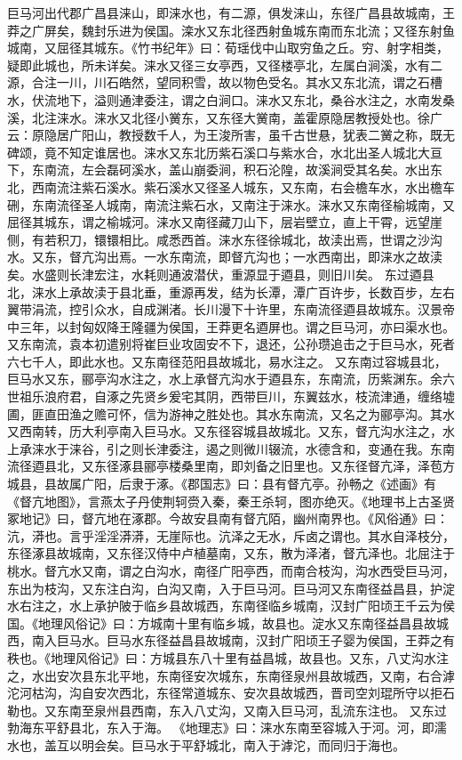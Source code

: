 \documentclass[12pt,UTF8]{ctexbook}
\begin{document}
巨马河出代郡广昌县涞山，即涞水也，有二源，俱发涞山，东径广昌县故城南，王莽之广屏矣，魏封乐进为侯国。滦水又东北径西射鱼城东南而东北流；又径东射鱼城南，又屈径其城东。《竹书纪年》曰：荀瑶伐中山取穷鱼之丘。穷、射字相类，疑即此城也，所未详矣。涞水又径三女亭西，又径楼亭北，左属白涧溪，水有二源，合注一川，川石皓然，望同积雪，故以物色受名。其水又东北流，谓之石槽水，伏流地下，溢则通津委注，谓之白涧口。涞水又东北，桑谷水注之，水南发桑溪，北注涞水。涞水又北径小黉东，又东径大黉南，盖霍原隐居教授处也。徐广云：原隐居广阳山，教授数千人，为王浚所害，虽千古世悬，犹表二黉之称，既无碑颂，竟不知定谁居也。涞水又东北历紫石溪口与紫水合，水北出圣人城北大亘下，东南流，左会磊砢溪水，盖山崩委涧，积石沦隍，故溪涧受其名矣。水出东北，西南流注紫石溪水。紫石溪水又径圣人城东，又东南，右会檐车水，水出檐车硎，东南流径圣人城南，南流注紫石水，又南注于涞水。涞水又东南径榆城南，又屈径其城东，谓之榆城河。涞水又南径藏刀山下，层岩壁立，直上干霄，远望崖侧，有若积刀，镮镮相比。咸悉西首。涞水东径徐城北，故渎出焉，世谓之沙沟水。又东，督亢沟出焉。一水东南流，即督亢沟也；一水西南出，即涞水之故渎矣。水盛则长津宏注，水耗则通波潜伏，重源显于逎县，则旧川矣。
东过逎县北，涞水上承故渎于县北垂，重源再发，结为长潭，潭广百许步，长数百步，左右翼带涓流，控引众水，自成渊渚。长川漫下十许里，东南流径逎县故城东。汉景帝中三年，以封匈奴降王隆疆为侯国，王莽更名逎屏也。谓之巨马河，亦曰渠水也。又东南流，袁本初遣别将崔巨业攻固安不下，退还，公孙瓒追击之于巨马水，死者六七千人，即此水也。又东南径范阳县故城北，易水注之。
又东南过容城县北，巨马水又东，郦亭沟水注之，水上承督亢沟水于逎县东，东南流，历紫渊东。余六世祖乐浪府君，自涿之先贤乡爰宅其阴，西带巨川，东翼兹水，枝流津通，缠络墟圃，匪直田渔之赡可怀，信为游神之胜处也。其水东南流，又名之为郦亭沟。其水又西南转，历大利亭南入巨马水。又东径容城县故城北。又东，督亢沟水注之，水上承涞水于涞谷，引之则长津委注，遏之则微川辍流，水德含和，变通在我。东南流径逎县北，又东径涿县郦亭楼桑里南，即刘备之旧里也。又东径督亢泽，泽苞方城县，县故属广阳，后隶于涿。《郡国志》曰：县有督亢亭。孙畅之《述画》有《督亢地图》，言燕太子丹使荆轲赍入秦，秦王杀轲，图亦绝灭。《地理书上古圣贤冢地记》曰，督亢地在涿郡。今故安县南有督亢陌，幽州南界也。《风俗通》曰：沆，漭也。言乎淫淫漭漭，无崖际也。沆泽之无水，斥卤之谓也。其水自泽枝分，东径涿县故城南，又东径汉侍中卢植墓南，又东，散为泽渚，督亢泽也。北屈注于桃水。督亢水又南，谓之白沟水，南径广阳亭西，而南合枝沟，沟水西受巨马河，东出为枝沟，又东注白沟，白沟又南，入于巨马河。巨马河又东南径益昌县，护淀水右注之，水上承护陂于临乡县故城西，东南径临乡城南，汉封广阳顷王千云为侯国。《地理风俗记》曰：方城南十里有临乡城，故县也。淀水又东南径益昌县故城西，南入巨马水。巨马水东径益昌县故城南，汉封广阳顷王子婴为侯国，王莽之有秩也。《地理风俗记》曰：方城县东八十里有益昌城，故县也。又东，八丈沟水注之，水出安次县东北平地，东南径安次城东，东南径泉州县故城西，又南，右合滹沱河枯沟，沟自安次西北，东径常道城东、安次县故城西，晋司空刘琨所守以拒石勒也。又东南至泉州县西南，东入八丈沟，又南入巨马河，乱流东注也。
又东过勃海东平舒县北，东入于海。
《地理志》曰：涞水东南至容城入于河。河，即濡水也，盖互以明会矣。巨马水于平舒城北，南入于滹沱，而同归于海也。
\end{document}
